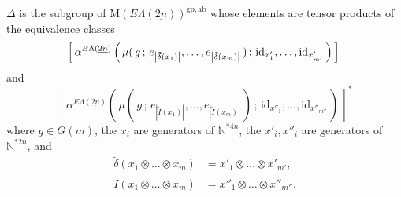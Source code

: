 \documentclass{amsbook} %
\newcommand{\id}{\textrm{id}}
\newcommand{\ELnn}{E\Lambda(\underline{2n})}
\numberwithin{section}{chapter}
\begin{document}
\begin{lem} $\Delta$ is the subgroup of $\mathrm{M}(\ELnn)^{\mathrm{gp, ab}}$ whose elements are tensor products of the equivalence classes
  \[
		\left[ \, \alpha^{\ELnn}\left( \, \mu( \, g \, ; \, e_{\left|\tilde{\delta}(x_1)\right|}, \ldots, e_{\left|\tilde{\delta}(x_m)\right|} \, ) \, ; \, \id_{x'_1}, \ldots,  \id_{x'_{m'}} \, \right) \, \right] \\
  \]
and
  \[
		\left[ \, \alpha^{\ELnn}\left( \, \mu( \, g \, ; \, e_{\left|\tilde{I}(x_1)\right|}, \ldots, e_{\left|\tilde{I}(x_m)\right|} \, ) \, ; \, \id_{x''_1}, \ldots,  \id_{x''_{m''}} \, \right) \, \right]^*
  \]
where $g \in G(m)$, the $x_i$ are generators of $\mathbb{N}^{\ast 4n}$, the $x'_i, x''_i$ are generators of $\mathbb{N}^{\ast 2n}$, and
  \begin{align*}
  	\tilde{\delta}( x_1 \otimes \ldots \otimes x_m) & =  x'_1 \otimes \ldots \otimes x'_{m'}, \\
  	\tilde{I}( x_1 \otimes \ldots \otimes x_m) & =  x''_1 \otimes \ldots \otimes x''_{m''}.
  \end{align*}
\end{lem}
\end{document}
